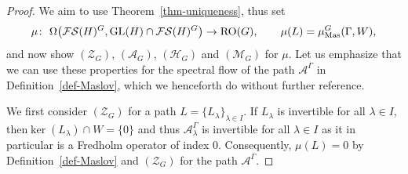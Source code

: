 \documentclass[pdftex]{sigma}
\numberwithin{equation}{section}
\theoremstyle{definition}
\DeclareMathOperator{\GL}{GL}
\begin{document}
\begin{proof}
We aim to use Theorem~\ref{thm-uniqueness}, thus set
\[\mu \colon \ \Omega\bigl(\mathcal{FS}(H)^G,\GL(H)\cap\mathcal{FS}(H)^G\bigr)\rightarrow \mathrm{RO}(G),\qquad \mu(L)=\mu^G_{\rm Mas}(\Gamma,W),\]
and now show $(\mathcal{Z}_G)$, $(\mathcal{A}_G)$, $(\mathcal{H}_G)$ and $(\mathcal{M}_G)$ for $\mu$. Let us emphasize that we can use these properties for the spectral flow of the path $\mathcal{A}^\Gamma$ in Definition~\ref{def-Maslov}, which we henceforth do without further reference.

We first consider $(\mathcal{Z}_G)$ for a path $L=\{L_\lambda\}_{\lambda\in I}$. If $L_\lambda$ is invertible for all $\lambda\in I$, then\linebreak $\ker(L_\lambda)\cap W=\{0\}$ and thus $\mathcal{A}^\Gamma_\lambda$ is invertible for all $\lambda\in I$ as it in particular is a Fredholm operator of index $0$. Consequently, $\mu(L)=0$ by Definition~\ref{def-Maslov} and $(\mathcal{Z}_G)$ for the path $\mathcal{A}^\Gamma$.


\end{proof}
\end{document}
